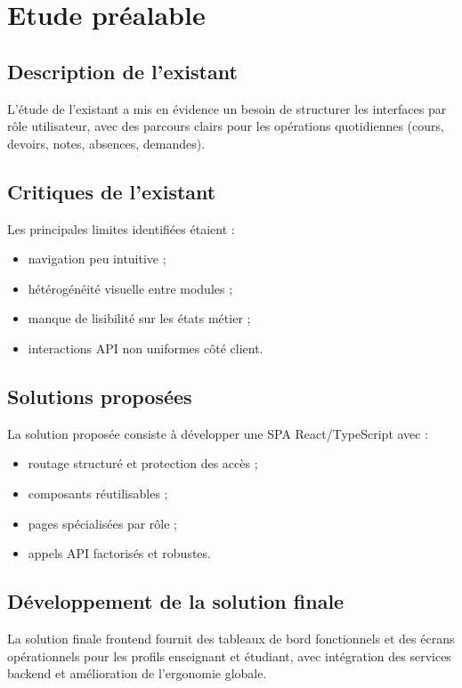 \chapter{Etude préalable}

\section{Description de l'existant}
L'étude de l'existant a mis en évidence un besoin de structurer les interfaces par rôle utilisateur, avec des parcours clairs pour les opérations quotidiennes (cours, devoirs, notes, absences, demandes).

\section{Critiques de l'existant}
Les principales limites identifiées étaient :
\begin{itemize}
	\item navigation peu intuitive ;
	\item hétérogénéité visuelle entre modules ;
	\item manque de lisibilité sur les états métier ;
	\item interactions API non uniformes côté client.
\end{itemize}

\section{Solutions proposées}
La solution proposée consiste à développer une SPA React/TypeScript avec :
\begin{itemize}
	\item routage structuré et protection des accès ;
	\item composants réutilisables ;
	\item pages spécialisées par rôle ;
	\item appels API factorisés et robustes.
\end{itemize}

\section{Développement de la solution finale}
La solution finale frontend fournit des tableaux de bord fonctionnels et des écrans opérationnels pour les profils enseignant et étudiant, avec intégration des services backend et amélioration de l'ergonomie globale.
